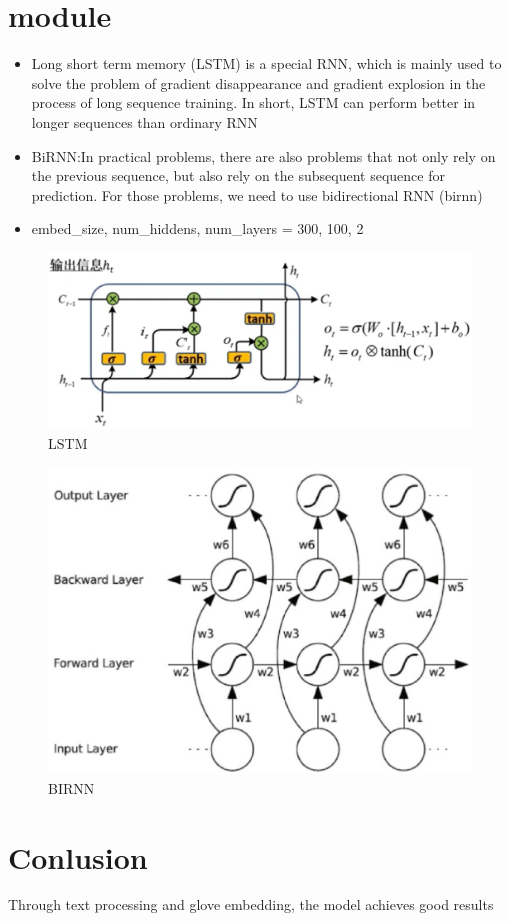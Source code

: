 \documentclass{amsart}
\begin{document}
\section{module}
\begin{itemize}
  \item Long short term memory (LSTM) is a special RNN, which is mainly used to solve the problem of gradient disappearance and gradient explosion in the process of long sequence training. In short, LSTM can perform better in longer sequences than ordinary RNN
  \item BiRNN:In practical problems, there are also problems that not only rely on the previous sequence, but also rely on the subsequent sequence for prediction. For those problems, we need to use bidirectional RNN (birnn)
  \item embed_size, num_hiddens, num_layers = 300, 100, 2
\end{itemize}
\begin{center}
  \begin{figure}
    \includegraphics[scale=0.5]{picture/lstm.eps}
    \caption{LSTM}\label{fig:2}
  \end{figure}
\end{center}
\begin{center}
  \begin{figure}
    \includegraphics[scale=0.5]{picture/birnn.eps}
    \caption{BIRNN}\label{fig:3}
  \end{figure}
\end{center}
\section{Conlusion}
Through text processing and glove embedding, the model achieves good results
\end{document}
